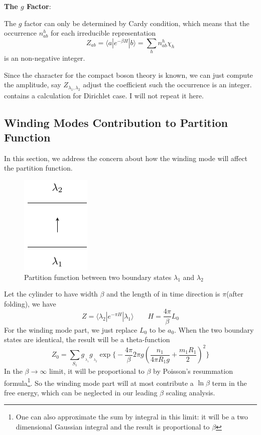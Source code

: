 \documentclass{article}
\begin{document}
{\bf The $g$ Factor}: 

The $g$ factor can only be determined by Cardy condition, which means that the occurrence $n^h_{ab}$ for each irreducible representation
\begin{equation}
Z_{ab} = \langle a | e^{- \beta  H }  | b \rangle  = \sum_{h} n_{ab}^h \chi_h 
\end{equation}
is an non-negative integer. 

Since the character for the compact boson theory is known, we can just compute the amplitude, say $Z_{\lambda_1, \lambda_2}$ adjust the coefficient such the occurrence is an integer. \cite{bachas_fusion_2008} contains a calculation for Dirichlet case. I will not repeat it here. 


\subsection{Winding Modes Contribution to Partition Function}

In this section, we address the concern about how the winding mode will affect the partition function.
\begin{figure}[h]
\centering
\includegraphics[width=	extwidth]{fig_part-lambda1-lambda2}\caption{Partition function between two boundary states $\lambda_1$ and $\lambda_2$}
\label{fig:part-lambda1-lambda2}
\end{figure}

Let the cylinder to have width $\beta$ and the length of in time direction is $\pi$(after folding), we have
\begin{equation}
Z = \langle \lambda_2 | e^{-\pi H} | \lambda_1 \rangle   \qquad H = \frac{4\pi}{ \beta} L_0 
\end{equation}
For the winding mode part, we just replace $L_0$ to be $a_0$. When the two boundary states are identical, the result will be a theta-function
\begin{equation}
Z_0 = \sum_{S_1 } g_{\,\!_{\lambda_1} }g_{\,\!_{\lambda_2} } \exp\Big\{- \frac{4\pi}{\beta} 2 \pi g ( \frac{n_1}{ 4 \pi R_1 g} + \frac{m_1 R_1 }{ 2} )^2 \Big\}
\end{equation}
In the $\beta \rightarrow \infty$ limit, it will be proportional to $\beta$ by Poisson's resummation formula\footnote{One can also approximate the sum by integral in this limit: it will be a two dimensional Gaussian integral and the result is proportional to $\beta$}. So the winding mode part will at most contribute a $\ln \beta$ term in the free energy, which can be neglected in our leading $\beta$ scaling analysis. 
\end{document}
